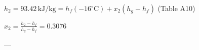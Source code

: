 \( h_2 = 93.42 \, \text{kJ/kg} = h_f(-16^\circ \text{C}) + x_2(h_g - h_f) \) (Table A10)  

\( x_2 = \frac{h_2 - h_f}{h_g - h_f} = 0.3076 \)  

---